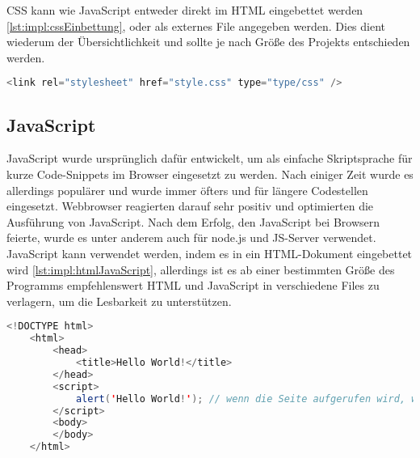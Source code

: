 CSS kann wie JavaScript entweder direkt im HTML eingebettet werden \ref{lst:impl:cssEinbettung}, oder als externes File angegeben werden. Dies dient wiederum der Übersichtlichkeit und sollte je nach Größe des Projekts entschieden werden.
\cite{durchstartenHTML}

\begin{lstlisting}[language=java,caption=CSS Einbettung,label=lst:impl:cssEinbettung]
    <link rel="stylesheet" href="style.css" type="type/css" />
\end{lstlisting}
 
\subsection{JavaScript}
JavaScript wurde ursprünglich dafür entwickelt, um als einfache Skriptsprache für kurze Code-Snippets im Browser eingesetzt zu werden. Nach einiger Zeit wurde es allerdings populärer und wurde immer öfters und für längere Codestellen eingesetzt. Webbrowser reagierten darauf sehr positiv und optimierten die Ausführung von JavaScript. Nach dem Erfolg, den JavaScript bei Browsern feierte, wurde es unter anderem auch für node.js und JS-Server verwendet.
\cite{typeJavaScript}
JavaScript kann verwendet werden, indem es in ein HTML-Dokument eingebettet wird \ref{lst:impl:htmlJavaScript}, allerdings ist es ab einer bestimmten Größe des Programms empfehlenswert HTML und JavaScript in verschiedene Files zu verlagern, um die Lesbarkeit zu unterstützen.
\cite{JavaScriptJavaEntwickler} 

\begin{lstlisting}[language=java,caption=HTML mit eingebettetem JavaScript,label=lst:impl:htmlJavaScript]
    <!DOCTYPE html>
    <html>
        <head>
            <title>Hello World!</title>
        </head>
        <script>
            alert('Hello World!'); // wenn die Seite aufgerufen wird, wird mithilfe von JavaScript ein Alert-Fenster mit 'Hello World!' ausgegeben
        </script>
        <body>
        </body>
    </html>
\end{lstlisting}